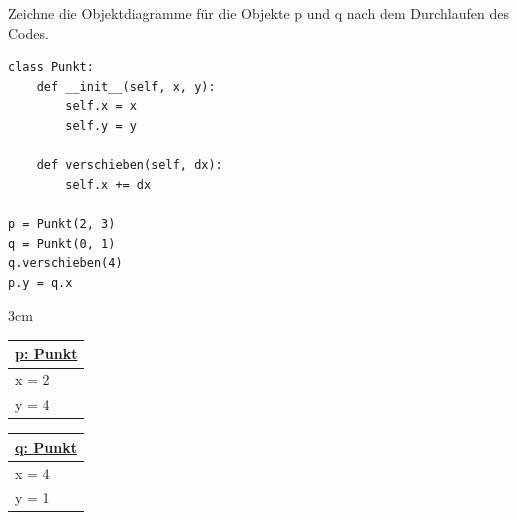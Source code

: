 \question[3]
Zeichne die Objektdiagramme für die Objekte p und q nach dem Durchlaufen des Codes.
\begin{lstlisting}
class Punkt:
    def __init__(self, x, y):
        self.x = x
        self.y = y

    def verschieben(self, dx):
        self.x += dx

p = Punkt(2, 3)
q = Punkt(0, 1)
q.verschieben(4)
p.y = q.x
\end{lstlisting}
\begin{solutionbox}{3cm}
\begin{tabular}{|l|}
\hline
\underline{p: Punkt} \\
\hline
x = 2 \\
y = 4 \\
\hline
\end{tabular}
\hspace{1cm}
\begin{tabular}{|l|}
\hline
\underline{q: Punkt} \\
\hline
x = 4 \\
y = 1 \\
\hline
\end{tabular}
\end{solutionbox}
